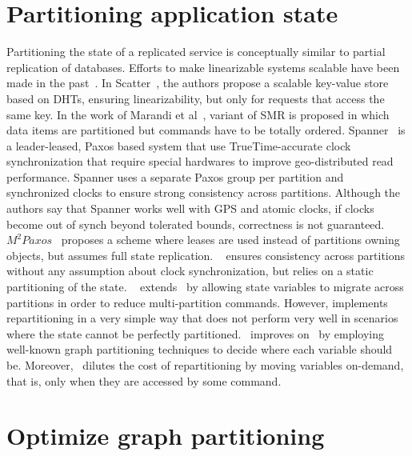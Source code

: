 \section{Partitioning application state}
Partitioning the state of a replicated service is conceptually similar to
partial replication of databases. Efforts to make linearizable systems scalable
have been made in the past~\cite{bezerra2014ssmr, corbett2013spanner,
Glendenning:2011kj, Marandi:2011dj}.  In Scatter~\cite{Glendenning:2011kj}, the
authors propose a scalable key-value store based on DHTs, ensuring
linearizability, but only for requests that access the same key. In the work of
Marandi et al~\cite{Marandi:2011dj}, variant of SMR is proposed in which data
items are partitioned but commands have to be totally ordered.
Spanner~\cite{corbett2013spanner} is a leader-leased, Paxos based system that
use TrueTime-accurate clock synchronization that require special hardwares to
improve geo-distributed read performance. Spanner uses a separate Paxos group
per partition and synchronized clocks to ensure strong consistency across
partitions. Although the authors say that Spanner works well with GPS and atomic
clocks, if clocks become out of synch beyond tolerated bounds, correctness is
not guaranteed. $M^2Paxos$~\cite{7579738} proposes a scheme where leases are
used instead of partitions owning objects, but assumes full state replication.
\ssmr{}~\cite{bezerra2014ssmr} ensures consistency across partitions without any
assumption about clock synchronization, but relies on a static partitioning of
the state. \dssmr{}~\cite{le2016dssmr} extends \ssmr\ by allowing state
variables to migrate across partitions in order to reduce multi-partition
commands. However, \dssmr{} implements repartitioning in a very simple way that
does not perform very well in scenarios where the state cannot be perfectly
partitioned. \dynastar\ improves on \dssmr\ by employing well-known graph
partitioning techniques to decide where each variable should be. Moreover,
\dynastar\ dilutes the cost of repartitioning by moving variables on-demand,
that is, only when they are accessed by some command.

\section{Optimize graph partitioning}

